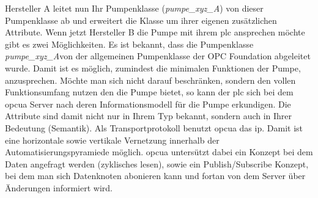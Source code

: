 Hersteller A leitet nun Ihr Pumpenklasse (\emph{pumpe\_xyz\_A}) von dieser Pumpenklasse ab und erweitert die Klasse um ihrer eigenen zusätzlichen Attribute.
Wenn jetzt Hersteller B die Pumpe mit ihrem \ac{plc} ansprechen möchte gibt es zwei Möglichkeiten.
Es ist bekannt, dass die Pumpenklasse \flqq \emph{pumpe\_xyz\_A}\frqq{}von der allgemeinen Pumpenklasse der OPC Foundation abgeleitet wurde.
Damit ist es möglich, zumindest die minimalen Funktionen der Pumpe, anzusprechen. 
Möchte man sich nicht darauf beschränken, sondern den vollen Funktionsumfang nutzen den die Pumpe bietet, 
so kann der \ac{plc} sich bei dem \ac{opcua} Server nach deren Informationsmodell für die Pumpe erkundigen.
Die Attribute sind damit nicht nur in Ihrem Typ bekannt, sondern auch in Ihrer Bedeutung (Semantik).
Als Transportprotokoll benutzt \ac{opcua} das \ac{ip}. 
Damit ist eine horizontale sowie vertikale Vernetzung innerhalb der Automatisierungspyramiede möglich.
\ac{opcua} untersützt dabei ein Konzept bei dem Daten angefragt werden (zyklisches lesen), sowie ein Publish/Subscribe Konzept, 
bei dem man sich Datenknoten abonieren kann und fortan von dem Server über Änderungen informiert wird.


